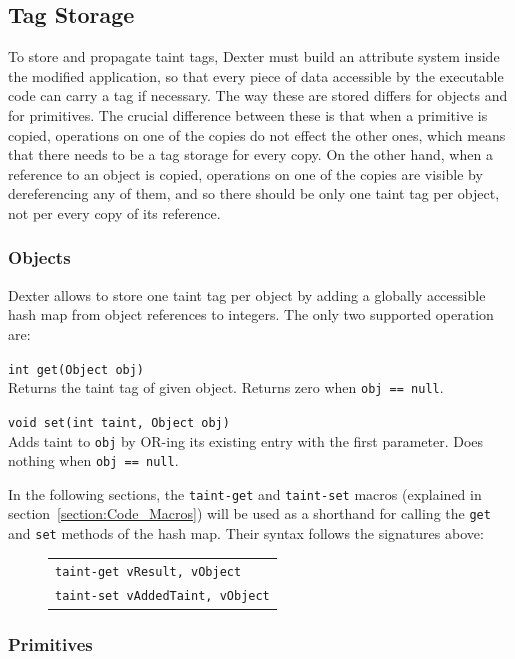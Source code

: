 \documentclass[12pt,twoside,notitlepage]{report}
\newcommand{\centerbox}[1] {
	\begin{center}
	\begin{footnotesize}
	\begin{tabular}{l}
		#1
	\end{tabular}
	\end{footnotesize}
	\end{center}
}
\newcommand{\asm}[1] {\texttt{#1}}
\begin{document}
\subsection{Tag Storage}

To store and propagate taint tags, Dexter must build an attribute system inside the modified application, so that every piece of data accessible by the executable code can carry a tag if necessary. The way these are stored differs for objects and for primitives. The crucial difference between these is that when a primitive is copied, operations on one of the copies do not effect the other ones, which means that there needs to be a tag storage for every copy. On the other hand, when a reference to an object is copied, operations on one of the copies are visible by dereferencing any of them, and so there should be only one taint tag per object, not per every copy of its reference. 

\subsubsection{Objects}
\label{section:TaintTagStorage_Objects}

Dexter allows to store one taint tag per object by adding a globally accessible hash map from object references to integers. The only two supported operation are:
\begin{description} 
\item \verb$int get(Object obj)$ \\
Returns the taint tag of given object. Returns zero when \verb$obj == null$.
\item \verb$void set(int taint, Object obj)$ \\
Adds taint to \verb$obj$ by OR-ing its existing entry with the first parameter. Does nothing when \verb$obj == null$.
\end{description}

In the following sections, the \verb$taint-get$ and \verb$taint-set$ macros (explained in section~\ref{section:Code_Macros}) will be used as a shorthand for calling the \verb$get$ and \verb$set$ methods of the hash map. Their syntax follows the signatures above:

	\begin{figure}[H]
		\centerbox{
			\asm{taint-get vResult, vObject} \\
			\asm{taint-set vAddedTaint, vObject}
		}
	\end{figure}

\subsubsection{Primitives}
\end{document}
